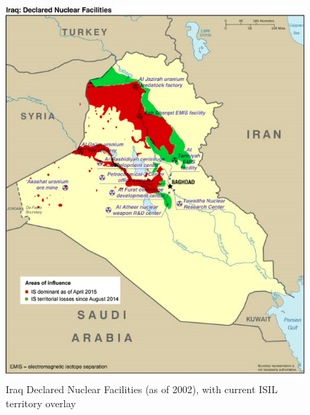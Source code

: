 \documentclass{report}
\begin{document}
\begin{figure}[H]
 \centering
 \includegraphics[trim = 0cm 0cm 0cm 0cm, clip,scale=.6]{./figures/nuke_facilities2.png}
   \caption{Iraq Declared Nuclear Facilities (as of 2002), with current ISIL territory overlay \cite{Fox2002}}
     \label{fig:nuke_facilities}
\end{figure}
\end{document}
